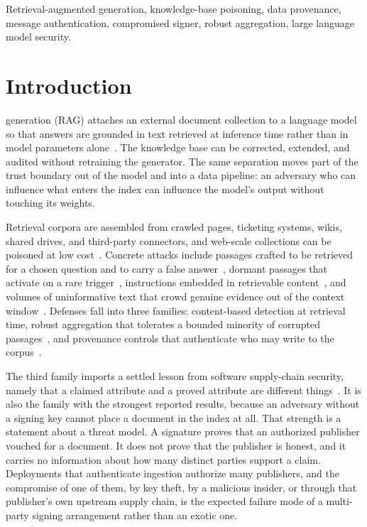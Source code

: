 \documentclass[lettersize,journal]{IEEEtran}
\begin{document}
\begin{IEEEkeywords}
Retrieval-augmented generation, knowledge-base poisoning, data provenance, message
authentication, compromised signer, robust aggregation, large language model security.
\end{IEEEkeywords}

\section{Introduction}

 generation (RAG) attaches an external document
collection to a language model so that answers are grounded in text retrieved at inference
time rather than in model parameters alone~\cite{lewis2020,guu2020,gao2024survey}. The
knowledge base can be corrected, extended, and audited without retraining the generator. The
same separation moves part of the trust boundary out of the model and into a data pipeline:
an adversary who can influence what enters the index can influence the model's output without
touching its weights.

Retrieval corpora are assembled from crawled pages, ticketing systems, wikis, shared drives,
and third-party connectors, and web-scale collections can be poisoned at low
cost~\cite{carlini2024poison}. Concrete attacks include passages crafted to be retrieved for a
chosen question and to carry a false answer~\cite{zou2024,zhong2023}, dormant passages that
activate on a rare trigger~\cite{xue2024badrag,cheng2024trojanrag,chaudhari2024phantom},
instructions embedded in retrievable content~\cite{greshake2023,liu2024formalizing}, and
volumes of uninformative text that crowd genuine evidence out of the context
window~\cite{shafran2024jamming}. Defenses fall into three families: content-based detection
at retrieval time, robust aggregation that tolerates a bounded minority of corrupted
passages~\cite{xiang2024robustrag,zhou2025trustrag}, and provenance controls that authenticate
who may write to the corpus~\cite{patil2026ragshield}.

The third family imports a settled lesson from software supply-chain security, namely that a
claimed attribute and a proved attribute are different
things~\cite{torresarias2019intoto,newman2022sigstore}. It is also the family with the
strongest reported results, because an adversary without a signing key cannot place a document
in the index at all. That strength is a statement about a threat model. A signature proves that
an authorized publisher vouched for a document. It does not prove that the publisher is honest,
and it carries no information about how many distinct parties support a claim. Deployments
that authenticate ingestion authorize many publishers, and the compromise of one of them, by
key theft, by a malicious insider, or through that publisher's own upstream supply chain, is
the expected failure mode of a multi-party signing arrangement rather than an exotic one.
\end{document}
